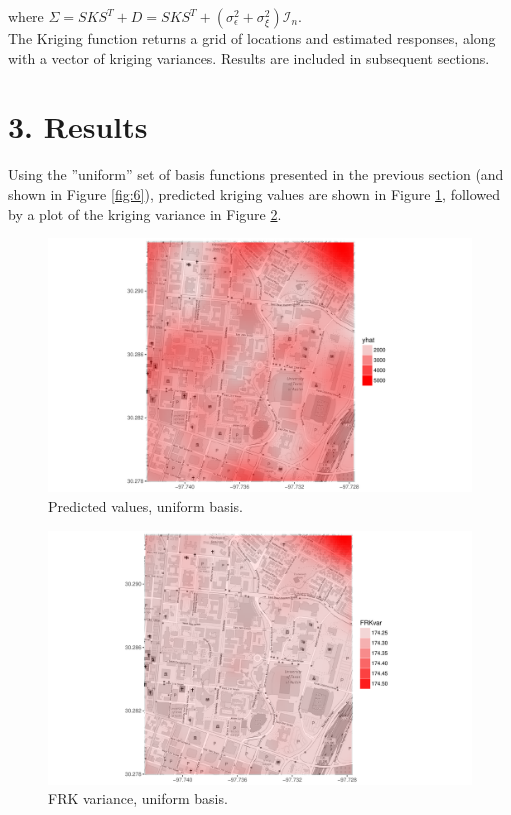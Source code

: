 \documentclass[11pt]{article}
\begin{document}
where $\Sigma = S K S^T + D = S K S^T + (\sigma_\epsilon^2 + \sigma_\xi^2) \mathcal{I}_n$.\\

The Kriging function returns a grid of locations and estimated responses, along with a vector of kriging variances.  Results are included in subsequent sections. \\

\newpage
\section{3. Results}

Using the ''uniform'' set of basis functions presented in the previous section (and shown in Figure \ref{fig:6}), predicted kriging values are shown in Figure \ref{fig:4}, followed by a plot of the kriging variance in Figure \ref{fig:5}. 

\begin{figure}[H]
\centering
\includegraphics[width=0.8\columnwidth]{Images/pred.pdf}
\caption{Predicted values, uniform basis.}
\label{fig:4}
\end{figure}

\begin{figure}[H]
\centering
\includegraphics[width=0.8\columnwidth]{Images/var.pdf}
\caption{FRK variance, uniform basis.}
\label{fig:5}
\end{figure}
\end{document}
